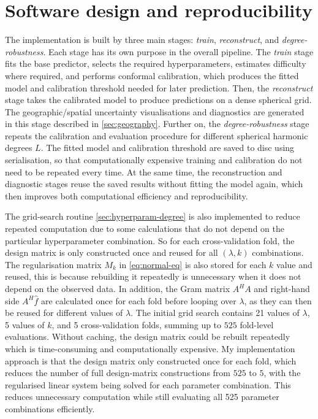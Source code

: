\documentclass[11pt,a4paper]{report}
\begin{document}
\section{Software design and reproducibility}
\label{sec:software-design}

The implementation is built by three main stages: \emph{train}, \emph{reconstruct}, and \emph{degree-robustness}. Each stage has its own purpose in the overall pipeline. The \emph{train} stage fits the base predictor, selects the required hyperparameters, estimates difficulty where required, and performs conformal calibration, which produces the fitted model and calibration threshold needed for later prediction. Then, the \emph{reconstruct} stage takes the calibrated model to produce predictions on a dense spherical grid. The geographic/spatial uncertainty visualisations and diagnostics are generated in this stage described in \cref{sec:geography}. Further on, the \emph{degree-robustness} stage repeats the calibration and evaluation procedure for different spherical harmonic degrees $L$. The fitted model and calibration threshold are saved to disc using serialisation, so that computationally expensive training and calibration do not need to be repeated every time. At the same time, the reconstruction and diagnostic stages reuse the saved results without fitting the model again, which then improves both computational efficiency and reproducibility.
 
The grid-search routine \cref{sec:hyperparam-degree} is also implemented to reduce repeated computation due to some calculations that do not depend on the particular hyperparameter combination. So for each cross-validation fold, the design matrix is only constructed once and reused for all $(\lambda,k)$ combinations. The regularisation matrix $M_k$ in \cref{eq:normal-eq} is also stored for each  $k$ value and reused, this is because rebuilding it repeatedly is unnecessary when it does not depend on the observed data. In addition, the Gram matrix $A^HA$ and right-hand side $A^H\hat f$ are calculated once for each fold before looping over $\lambda$, as they can then be reused for different values of $\lambda$. The initial grid search contains 21 values of $\lambda$, 5 values of $k$, and 5 cross-validation folds, summing up to $525$ fold-level evaluations. Without caching, the design matrix could be rebuilt repeatedly which is time-consuming and computationally expensive. My implementation approach is that the design matrix only constructed once for each fold, which reduces the number of full design-matrix constructions from $525$ to $5$, with the regularised linear system being solved for each parameter combination. This reduces unnecessary computation while still evaluating all 525 parameter combinations efficiently.
\end{document}

